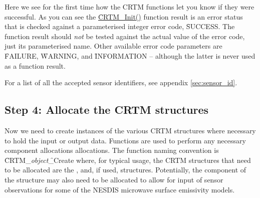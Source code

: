 Here we see for the first time how the CRTM functions let you know if they were successful. As you can see the \hyperref[sec:CRTM_Init_interface]{\f{CRTM\_Init()}} function result is an error status that is checked against a parameterised integer error code, \f{SUCCESS}. The function result should \emph{not} be tested against the actual value of the error code, just its parameterised name. Other available error code parameters are \f{FAILURE}, \f{WARNING}, and \f{INFORMATION} -- although the latter is never used as a function result.

For a list of all the accepted sensor identifiers, see appendix \ref{sec:sensor_id}.


\subsection{Step 4: Allocate the CRTM structures}
\label{sec:alloc_step}
Now we need to create instances of the various CRTM structures where necessary to hold the input or output data. Functions are used to perform any necessary component allocations allocations. The function naming convention is \f{CRTM\_}\textit{object}\f{\_Create} where, for typical usage, the CRTM structures that need to be allocated are the \hyperref[sec:atmosphere_structure]{\Atmosphere}, \hyperref[sec:rtsolution_structure]{\RTSolution} and, if used, \hyperref[sec:options_structure]{\Options} structures. Potentially, the \hyperref[sec:sensordata_structure]{\SensorData} component of the \hyperref[sec:surface_structure]{\Surface} structure may also need to be allocated to allow for input of sensor observations for some of the NESDIS microwave surface emissivity models.

